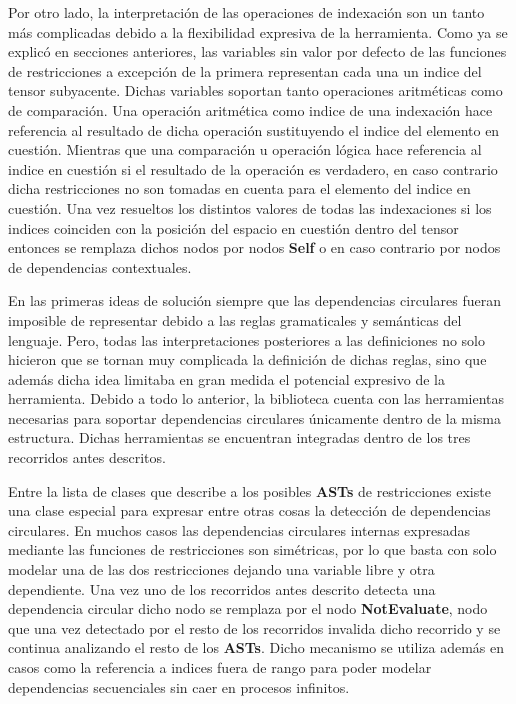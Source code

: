 Por otro lado, la interpretación de las operaciones de indexación son un tanto más complicadas debido a la flexibilidad expresiva de
la herramienta. Como ya se explicó en secciones anteriores, las variables sin valor por defecto de las funciones de restricciones a
excepción de la primera representan cada una un indice del tensor subyacente. Dichas variables soportan tanto operaciones aritméticas
como de comparación. Una operación aritmética como indice de una indexación hace referencia al resultado de dicha operación sustituyendo
el indice del elemento en cuestión. Mientras que una comparación u operación lógica hace referencia al indice en cuestión si el resultado
de la operación es verdadero, en caso contrario dicha restricciones no son tomadas en cuenta para el elemento del indice en cuestión.
Una vez resueltos los distintos valores de todas las indexaciones si los indices coinciden con la posición del espacio en cuestión dentro
del tensor entonces se remplaza dichos nodos por nodos {\bf Self} o en caso contrario por nodos de dependencias contextuales.

En las primeras ideas de solución siempre que las dependencias circulares fueran imposible de representar debido a
las reglas gramaticales y semánticas del lenguaje. Pero, todas las interpretaciones posteriores a las definiciones no solo hicieron
que se tornan muy complicada la definición de dichas reglas, sino que además dicha idea limitaba en gran
medida el potencial expresivo de la herramienta. Debido a todo lo anterior, la biblioteca cuenta con las herramientas necesarias para
soportar dependencias circulares únicamente dentro de la misma estructura. Dichas herramientas se encuentran integradas dentro de los
tres recorridos antes descritos.

Entre la lista de clases que describe a los posibles {\bf ASTs} de restricciones existe una clase especial para expresar entre otras cosas
la detección de dependencias circulares. En muchos casos las dependencias circulares internas expresadas mediante las
funciones de restricciones son simétricas, por lo que basta con solo modelar una de las dos restricciones dejando una variable libre
y otra dependiente. Una vez uno de los recorridos antes descrito detecta una dependencia circular dicho nodo se remplaza por el nodo {\bf NotEvaluate},
nodo que una vez detectado por el resto de los recorridos invalida dicho recorrido y se continua analizando el resto de los {\bf ASTs}.
Dicho mecanismo se utiliza además en casos como la referencia a indices fuera de rango para poder modelar dependencias secuenciales
sin caer en procesos infinitos.


